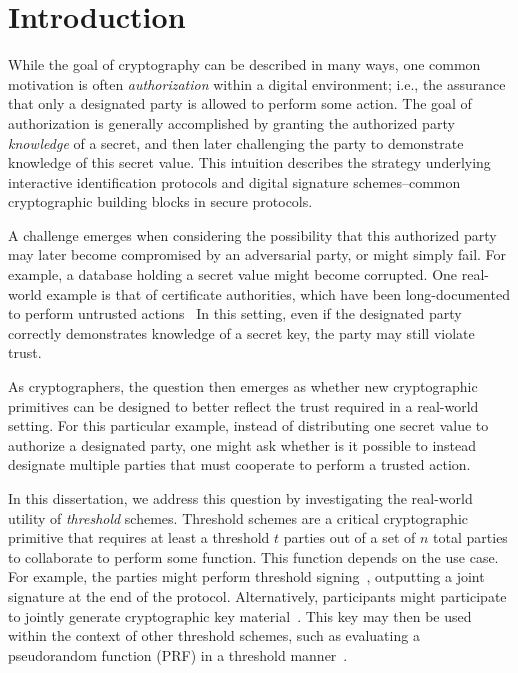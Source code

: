 \chapter{Introduction}
\label{chp:intro}

While the goal of cryptography can be described in many ways,
one common motivation is often \emph{authorization} within a digital environment;
i.e., the assurance that only a designated party is allowed to perform some action.
The goal of authorization is generally accomplished by granting the authorized party \emph{knowledge} of a secret,
and then later challenging the party to demonstrate knowledge of this secret value.
This intuition describes the strategy underlying interactive identification
protocols and digital signature schemes--common cryptographic building blocks in secure protocols.

A challenge emerges when considering the possibility that this authorized party may later become compromised by an adversarial party,
or might simply fail.
For example,
a database holding a secret value might become corrupted.
One real-world example is that of certificate authorities,
which have been long-documented to perform untrusted actions~\cite{SSLMate}
In this setting,
even if the designated party correctly demonstrates knowledge of a secret key,
the party may still violate trust.

As cryptographers,
the question then emerges as whether new cryptographic primitives can be designed to better reflect the trust required in a real-world setting.
For this particular example,
instead of distributing one secret value to authorize a designated party,
one might ask whether is it possible to instead designate multiple parties that must cooperate to perform a trusted action.

In this dissertation,
we address this question by investigating the real-world utility of \emph{threshold} schemes.
Threshold schemes are a critical cryptographic primitive that
requires at least a threshold $t$ parties out of a set of $n$ total parties to collaborate to perform some function.
This function depends on the use case.
For example,
the parties might perform threshold signing~\cite{KomloG20,BellareCKMTZ22,Lindell22},
outputting a joint signature at the end of the protocol.
Alternatively, participants might participate to jointly generate cryptographic key
material~\cite{Pedersen91,GennaroJKR07,KomloG20,Groth21,GurkanJMMST21,BonehS2020,NejiBR16,Lindell22,DasYXMKR21,BachoL22,AbrahamJMMS2022}.
This key may then be used within the context of other threshold schemes,
such as evaluating a pseudorandom function (PRF) in a threshold manner~\cite{JareckiKR18}.


